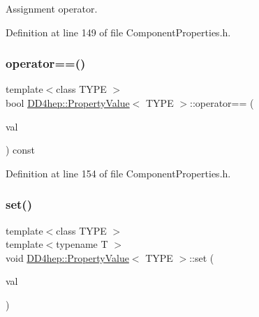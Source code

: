 Assignment operator. 



Definition at line 149 of file Component\+Properties.\+h.

\hypertarget{class_d_d4hep_1_1_property_value_a63369b712ab6d115fae50dbd9c57fc88}{}\label{class_d_d4hep_1_1_property_value_a63369b712ab6d115fae50dbd9c57fc88} 
\subsubsection{\texorpdfstring{operator==()}{operator==()}}
{\footnotesize\ttfamily template$<$class T\+Y\+PE $>$ \\
bool \hyperlink{class_d_d4hep_1_1_property_value}{D\+D4hep\+::\+Property\+Value}$<$ T\+Y\+PE $>$\+::operator== (\begin{DoxyParamCaption}\item[{const T\+Y\+PE \&}]{val }\end{DoxyParamCaption}) const\hspace{0.3cm}{\ttfamily [inline]}}



Definition at line 154 of file Component\+Properties.\+h.

\hypertarget{class_d_d4hep_1_1_property_value_aa7c35e6fcfbff52b97c2ebbbae03dc2c}{}\label{class_d_d4hep_1_1_property_value_aa7c35e6fcfbff52b97c2ebbbae03dc2c} 
\subsubsection{\texorpdfstring{set()}{set()}}
{\footnotesize\ttfamily template$<$class T\+Y\+PE $>$ \\
template$<$typename T $>$ \\
void \hyperlink{class_d_d4hep_1_1_property_value}{D\+D4hep\+::\+Property\+Value}$<$ T\+Y\+PE $>$\+::set (\begin{DoxyParamCaption}\item[{const \hyperlink{class_t}{T} \&}]{val }\end{DoxyParamCaption})\hspace{0.3cm}{\ttfamily [inline]}}



